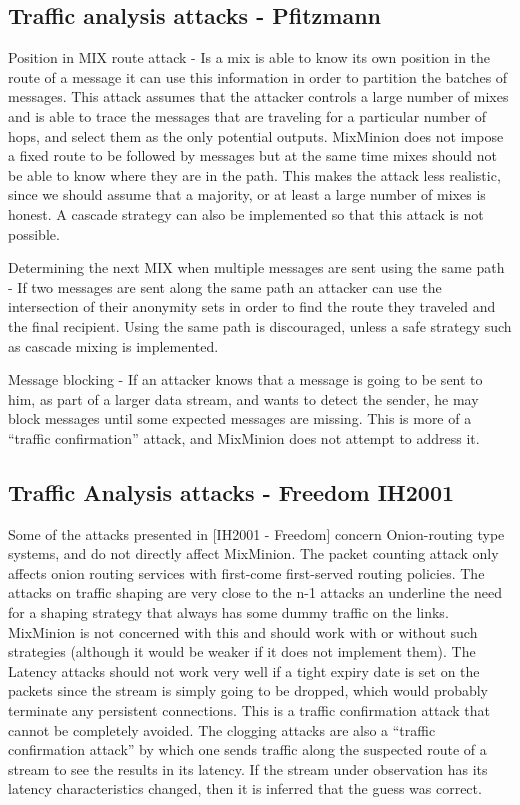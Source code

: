 \documentclass{article}
\begin{document}
\subsection{Traffic analysis attacks - Pfitzmann}

Position in MIX route attack - Is a mix is able to know its own
position in the route of a message it can use this information in
order to partition the batches of messages. This attack assumes that
the attacker controls a large number of mixes and is able to trace the
messages that are traveling for a particular number of hops, and select
them as the only potential outputs. MixMinion does not impose a fixed
route to be followed by messages but at the same time mixes should not
be able to know where they are in the path. This makes the attack less
realistic, since we should assume that a majority, or at least a large
number of mixes is honest. A cascade strategy can also be implemented
so that this attack is not possible.

Determining the next MIX when multiple messages are sent using the
same path - If two messages are sent along the same path an attacker
can use the intersection of their anonymity sets in order to find the
route they traveled and the final recipient. Using the same path is
discouraged, unless a safe strategy such as cascade mixing is
implemented. 

Message blocking - If an attacker knows that a message is going to be
sent to him, as part of a larger data stream, and wants to detect the
sender, he may block messages until some expected messages are
missing. This is more of a ``traffic confirmation'' attack, and
MixMinion does not attempt to address it.

\subsection{Traffic Analysis attacks - Freedom IH2001}

Some of the attacks presented in [IH2001 - Freedom] concern
Onion-routing type systems, and do not directly affect MixMinion. The
packet counting attack only affects onion routing services with
first-come first-served routing policies. The attacks on traffic
shaping are very close to the n-1 attacks an underline the need for a
shaping strategy that always has some dummy traffic on the
links. MixMinion is not concerned with this and should work with or
without such strategies (although it would be weaker if it does not
implement them). The Latency attacks should not work very well if a
tight expiry date is set on the packets since the stream is simply
going to be dropped, which would probably terminate any persistent
connections. This is a traffic confirmation attack that cannot be
completely avoided. The clogging attacks are also a ``traffic
confirmation attack'' by which one sends traffic along the suspected
route of a stream to see the results in its latency. If the stream
under observation has its latency characteristics changed, then it is
inferred that the guess was correct.
\end{document}
